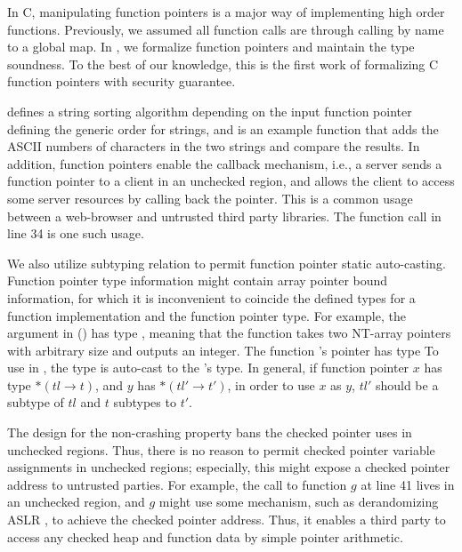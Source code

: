 In C, manipulating function pointers is a major way of implementing high order functions.
Previously, we assumed all function calls are through calling by name to a global map.
In \systemname, we formalize function pointers and maintain the \systemname type soundness.
To the best of our knowledge,
this is the first work of formalizing C function pointers with security guarantee.

 defines a string sorting algorithm
depending on the input function pointer  defining the generic order for strings,
and  is an example  function
that adds the ASCII numbers of characters in the two strings and compare the results.
In addition, function pointers enable the callback mechanism,
i.e., a server sends a function pointer to a client in an unchecked region,
and allows the client to access some server resources by calling back the pointer.
This is a common usage between a web-browser and untrusted third party libraries.
The function call in  line 34 is one such usage.

We also utilize \systemname subtyping relation to permit function pointer static auto-casting.
Function pointer type information might contain array pointer bound information,
for which it is inconvenient to coincide the defined types for a function implementation and the function pointer type. 
For example, the  argument in  ()
has type ,
meaning that the function takes two NT-array pointers with arbitrary size and outputs an integer.
The function 's pointer has type 
To use  in , the type is auto-cast to the 's type.
In general, if function pointer $x$ has type $* (tl \to t)$, and  $y$ has $* (tl' \to t')$,
in order to use $x$ as $y$, $tl'$ should be a subtype of $tl$ and $t$ subtypes to $t'$.

The design for the non-crashing property bans the checked pointer uses in unchecked regions.
Thus, there is no reason to permit checked pointer variable assignments in unchecked regions;
especially, this might expose a checked pointer address to untrusted parties.
For example, the call to function $g$ at  line 41 lives in an unchecked region,
and $g$ might use some mechanism, such as derandomizing ASLR \cite{shacham-aslr},
to achieve the checked pointer address.
Thus, it enables a third party to access any checked heap and function data by simple pointer arithmetic.

